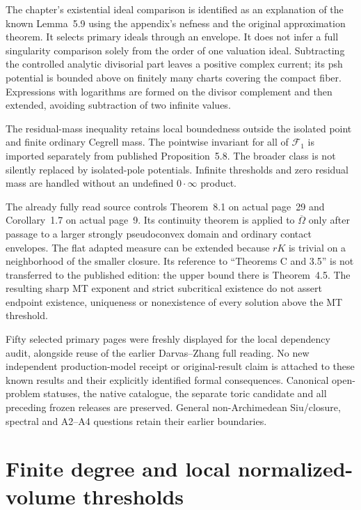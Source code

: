 The chapter's existential ideal comparison is identified as an
explanation of the known Lemma~5.9 using the appendix's nefness
and the original approximation theorem. It selects primary
ideals through an envelope. It does not infer a full singularity
comparison solely from the order of one valuation ideal.
Subtracting the controlled analytic divisorial part leaves a
positive complex current; its psh potential is bounded above
on finitely many charts covering the compact fiber. Expressions
with logarithms are formed on the divisor complement and then
extended, avoiding subtraction of two infinite values.

The residual-mass inequality retains local boundedness outside
the isolated point and finite ordinary Cegrell mass. The pointwise
invariant for all of $\mathcal F_1$ is imported separately
from published Proposition~5.8. The broader class is not
silently replaced by isolated-pole potentials. Infinite
thresholds and zero residual mass are handled without an
undefined $0\cdot\infty$ product.

The already fully read source \cite{DarvasZhang26KltV2}
controls Theorem~8.1 on actual page~29 and Corollary~1.7 on
actual page~9. Its continuity theorem is applied to
$\overline\Omega$ only after passage to a larger strongly
pseudoconvex domain and ordinary contact envelopes. The flat
adapted measure can be extended because $rK$ is trivial on
a neighborhood of the smaller closure. Its reference to
``Theorems C and 3.5'' is not transferred to the published
edition: the upper bound there is Theorem~4.5. The resulting
sharp MT exponent and strict subcritical existence do not
assert endpoint existence, uniqueness or nonexistence of
every solution above the MT threshold.

Fifty selected primary pages were freshly displayed for the
local dependency audit, alongside reuse of the earlier
Darvas--Zhang full reading. No new independent production-model
receipt or original-result claim is attached to these known
results and their explicitly identified formal consequences.
Canonical open-problem statuses, the native catalogue, the
separate toric candidate and all preceding frozen releases
are preserved. General non-Archimedean Siu/closure, spectral
and A2--A4 questions retain their earlier boundaries.

\section{Finite degree and local normalized-volume thresholds}
\label{sec:provenance-local-klt-finite-degree}

